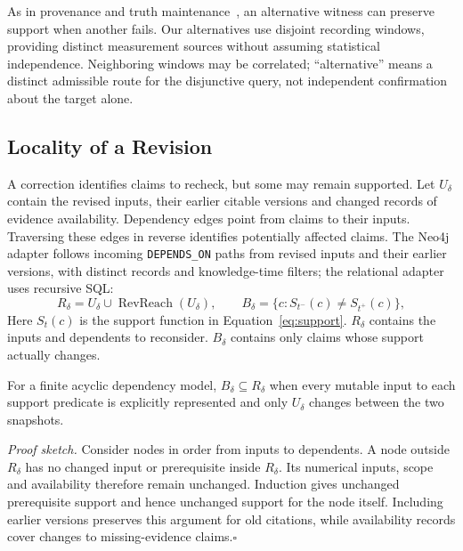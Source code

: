 \documentclass[runningheads]{llncs}
\begin{document}
As in provenance and truth maintenance~\cite{green2007,doyle1979},
an alternative witness can preserve support when another fails.
Our alternatives use disjoint recording windows, providing distinct
measurement sources without assuming statistical independence. Neighboring
windows may be correlated; ``alternative'' means a distinct admissible route
for the disjunctive query, not independent confirmation about the target alone.



\subsection{Locality of a Revision}

A correction identifies claims to recheck, but some may remain supported.
Let $U_\delta$ contain the revised inputs, their earlier citable versions and
changed records of evidence availability. Dependency edges point from claims
to their inputs. Traversing these edges in reverse identifies potentially
affected claims. The Neo4j adapter follows incoming \texttt{DEPENDS\_ON}
paths from revised inputs and their earlier versions, with distinct records
and knowledge-time filters; the relational adapter uses recursive SQL:
\begin{equation}
 R_\delta=U_\delta\cup\operatorname{RevReach}(U_\delta),\qquad
 B_\delta=\{c:S_{t^-}(c)\ne S_{t^+}(c)\},
 \label{eq:locality}
\end{equation}
Here $S_t(c)$ is the support function in Equation~\ref{eq:support}.
$R_\delta$ contains the inputs and dependents to reconsider.
$B_\delta$ contains only claims whose support actually changes.

\begin{proposition}
For a finite acyclic dependency model, $B_\delta\subseteq R_\delta$ when every
mutable input to each support predicate is explicitly represented and only
$U_\delta$ changes between the two snapshots.
\end{proposition}
\noindent\emph{Proof sketch.}
Consider nodes in order from inputs to dependents. A node outside $R_\delta$
has no changed input or prerequisite inside $R_\delta$. Its numerical inputs,
scope and availability therefore remain unchanged. Induction gives unchanged
prerequisite support and hence unchanged support for the node itself.
Including earlier versions preserves this argument for old citations, while
availability records cover changes to missing-evidence claims.\hfill$\square$
\end{document}

